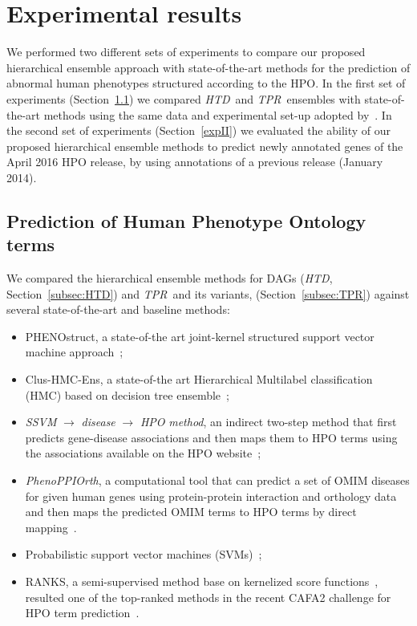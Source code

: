\documentclass{bioinfo}
\newcommand{\htd}{{\em HTD}}
\newcommand{\tpr}{{\em TPR}}
\begin{document}

\section{Experimental results}
\label{sec:results-discussion}
We performed two different sets of experiments to compare our proposed hierarchical ensemble approach with state-of-the-art methods for the prediction of abnormal human phenotypes structured according to the HPO.
In the first set of experiments (Section~\ref{expI}) we compared \htd~and \tpr~ensembles with  state-of-the-art methods
using the same data and experimental set-up adopted by~\citet{PHENO15}.
In the second set of experiments (Section~\ref{expII}) we evaluated the ability of our proposed hierarchical ensemble methods to predict newly
annotated genes of the April 2016 HPO release, by using annotations of a previous release (January 2014).
 
\subsection{Prediction of Human Phenotype Ontology terms}
\label{expI}
We compared the hierarchical ensemble methods for DAGs (\htd, Section~\ref{subsec:HTD}) and \tpr~and its variants, (Section~\ref{subsec:TPR}) against several state-of-the-art and baseline methods: 
\begin{itemize}
\item PHENOstruct, a state-of-the art joint-kernel structured support vector machine approach~\citep{PHENO15};
\item Clus-HMC-Ens, a state-of-the art Hierarchical Multilabel classification (HMC) based on decision tree ensemble~\citep{Schietgat10};
\item \textsl{SSVM} $\rightarrow$ {\em disease} $\rightarrow$ \textsl{HPO} {\em method}, an indirect two-step method that first predicts gene-disease associations and then maps them to HPO terms using the associations available on the HPO website~\citep{PHENO15};
\item {\em PhenoPPIOrth}, a computational tool that can predict a set of OMIM diseases for given human genes using protein-protein interaction and orthology data and then maps the predicted OMIM terms to HPO terms by direct mapping~\citep{Wang13}.
\item Probabilistic support vector machines (SVMs)~\citep{Pla99};
\item RANKS, a semi-supervised method base on kernelized score functions~\citep{Vale16a}, resulted one of the top-ranked methods in the recent CAFA2 challenge for HPO term prediction~\citep{Jiang16}.
\end{itemize}
\end{document}
